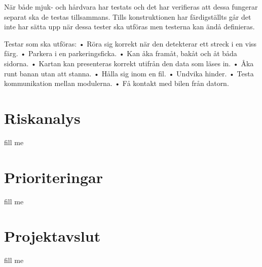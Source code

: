 \documentclass[projektplan/plan.tex]{subfiles}
\begin{document}
När både mjuk- och hårdvara har testats och det har verifieras att dessa fungerar separat ska de testas tillsammans. Tills konstruktionen har färdigställts går det inte har sätta upp när dessa tester ska utföras men testerna kan ändå definieras.

Testar som ska utföras:
•	Röra sig korrekt när den detekterar ett streck i en viss färg.
•	Parkera i en parkeringsficka.
•	Kan åka framåt, bakåt och åt båda sidorna.
•	Kartan kan presenteras korrekt utifrån den data som läses in.
•	Åka runt banan utan att stanna.
•	Hålla sig inom en fil.
•	Undvika hinder.
•	Testa kommunikation mellan modulerna.
•	Få kontakt med bilen från datorn.

\section{Riskanalys}
fill me

\section{Prioriteringar}
fill me

\section{Projektavslut}
fill me
\end{document}

